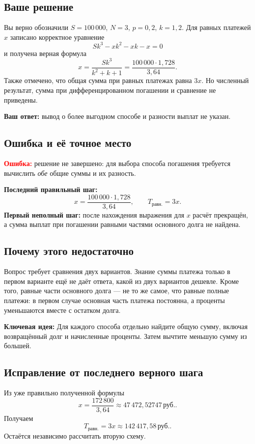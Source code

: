 \documentclass[12pt,a4paper]{article}
\newcommand{\rub}{\,\text{руб.}}
\newcommand{\Err}{\textcolor{red}{\textbf{Ошибка:}}}
\newcommand{\Idea}{\textcolor{blue!60!black}{\textbf{Ключевая идея:}}}
\begin{document}
\subsection*{Ваше решение}
Вы верно обозначили $S=100\,000$, $N=3$, $p=0{,}2$, $k=1{,}2$. Для равных платежей $x$ записано корректное уравнение
\[
Sk^3-xk^2-xk-x=0
\]
и получена верная формула
\[
x=\frac{Sk^3}{k^2+k+1}
=\frac{100\,000\cdot1{,}728}{3{,}64}.
\]
Также отмечено, что общая сумма при равных платежах равна $3x$. Но численный результат, сумма при дифференцированном погашении и сравнение не приведены.

\textbf{Ваш ответ:} вывод о более выгодном способе и разности выплат не указан.

\subsection*{Ошибка и её точное место}
\Err{} решение не завершено: для выбора способа погашения требуется вычислить \emph{обе} общие суммы и их разность.

\textbf{Последний правильный шаг:}
\[
x=\frac{100\,000\cdot1{,}728}{3{,}64},\qquad T_{\text{равн.}}=3x.
\]
\textbf{Первый неполный шаг:} после нахождения выражения для $x$ расчёт прекращён, а сумма выплат при погашении равными частями основного долга не найдена.

\subsection*{Почему этого недостаточно}
Вопрос требует сравнения двух вариантов. Знание суммы платежа только в первом варианте ещё не даёт ответа, какой из двух вариантов дешевле. Кроме того, равные части основного долга --- не то же самое, что равные полные платежи: в первом случае основная часть платежа постоянна, а проценты уменьшаются вместе с остатком долга.

\Idea{} Для каждого способа отдельно найдите общую сумму, включая возвращённый долг и начисленные проценты. Затем вычтите меньшую сумму из большей.

\subsection*{Исправление от последнего верного шага}
Из уже правильно полученной формулы
\[
x=\frac{172\,800}{3{,}64}\approx47\,472{,}52747\rub.
\]
Получаем
\[
T_{\text{равн.}}=3x\approx142\,417{,}58\rub.
\]
Остаётся независимо рассчитать вторую схему.
\end{document}
